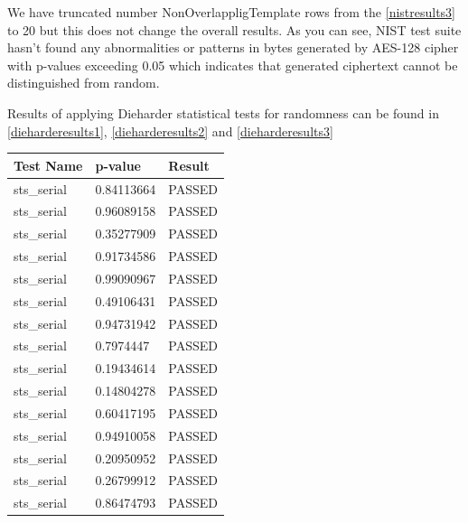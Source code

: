 \documentclass[conference]{IEEEtran}
\begin{document}
We have truncated number NonOverlappligTemplate rows from the \autoref{nistresults3} to 20 but this does not change the overall results. As you can see, NIST test suite hasn't found any abnormalities or patterns in bytes generated by AES-128 cipher with p-values exceeding 0.05 which indicates that  generated ciphertext cannot be distinguished from random. 

Results of applying Dieharder statistical tests for randomness can be found in \autoref{dieharderesults1}, \autoref{dieharderesults2} and \autoref{dieharderesults3}

\begin{center}
\begin{table}
\renewcommand{\arraystretch}{1.2}
\centering
\begin{tabular}{|l|l|l|}
\hline
Test Name                              & p-value    & Result \\ \hline
sts\_serial                            & 0.84113664 & PASSED \\ \hline
sts\_serial                            & 0.96089158 & PASSED \\ \hline
sts\_serial                            & 0.35277909 & PASSED \\ \hline
sts\_serial                            & 0.91734586 & PASSED \\ \hline
sts\_serial                            & 0.99090967 & PASSED \\ \hline
sts\_serial                            & 0.49106431 & PASSED \\ \hline
sts\_serial                            & 0.94731942 & PASSED \\ \hline
sts\_serial                            & 0.7974447  & PASSED \\ \hline
sts\_serial                            & 0.19434614 & PASSED \\ \hline
sts\_serial                            & 0.14804278 & PASSED \\ \hline
sts\_serial                            & 0.60417195 & PASSED \\ \hline
sts\_serial                            & 0.94910058 & PASSED \\ \hline
sts\_serial                            & 0.20950952 & PASSED \\ \hline
sts\_serial                            & 0.26799912 & PASSED \\ \hline
sts\_serial                            & 0.86474793 & PASSED \\ \hline

\end{tabular}
\end{table}
\end{center}
\end{document}
